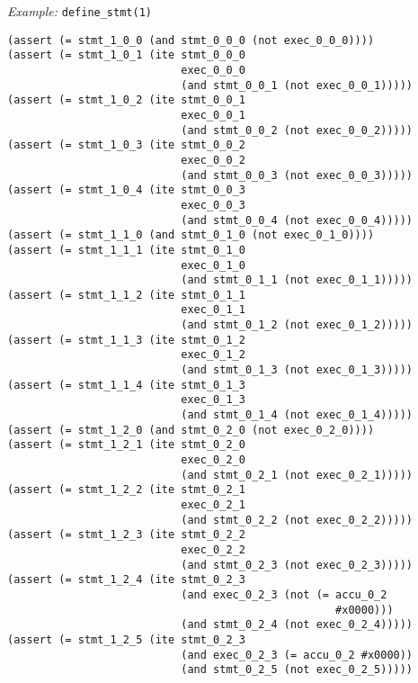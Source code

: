 \noindent
\emph{Example:} \lstinline[style=c++]{define_stmt(1)}

\newpage

\begin{lstlisting}[language=smtlib]
(assert (= stmt_1_0_0 (and stmt_0_0_0 (not exec_0_0_0))))
(assert (= stmt_1_0_1 (ite stmt_0_0_0
                           exec_0_0_0
                           (and stmt_0_0_1 (not exec_0_0_1)))))
(assert (= stmt_1_0_2 (ite stmt_0_0_1
                           exec_0_0_1
                           (and stmt_0_0_2 (not exec_0_0_2)))))
(assert (= stmt_1_0_3 (ite stmt_0_0_2
                           exec_0_0_2
                           (and stmt_0_0_3 (not exec_0_0_3)))))
(assert (= stmt_1_0_4 (ite stmt_0_0_3
                           exec_0_0_3
                           (and stmt_0_0_4 (not exec_0_0_4)))))
(assert (= stmt_1_1_0 (and stmt_0_1_0 (not exec_0_1_0))))
(assert (= stmt_1_1_1 (ite stmt_0_1_0
                           exec_0_1_0
                           (and stmt_0_1_1 (not exec_0_1_1)))))
(assert (= stmt_1_1_2 (ite stmt_0_1_1
                           exec_0_1_1
                           (and stmt_0_1_2 (not exec_0_1_2)))))
(assert (= stmt_1_1_3 (ite stmt_0_1_2
                           exec_0_1_2
                           (and stmt_0_1_3 (not exec_0_1_3)))))
(assert (= stmt_1_1_4 (ite stmt_0_1_3
                           exec_0_1_3
                           (and stmt_0_1_4 (not exec_0_1_4)))))
(assert (= stmt_1_2_0 (and stmt_0_2_0 (not exec_0_2_0))))
(assert (= stmt_1_2_1 (ite stmt_0_2_0
                           exec_0_2_0
                           (and stmt_0_2_1 (not exec_0_2_1)))))
(assert (= stmt_1_2_2 (ite stmt_0_2_1
                           exec_0_2_1
                           (and stmt_0_2_2 (not exec_0_2_2)))))
(assert (= stmt_1_2_3 (ite stmt_0_2_2
                           exec_0_2_2
                           (and stmt_0_2_3 (not exec_0_2_3)))))
(assert (= stmt_1_2_4 (ite stmt_0_2_3
                           (and exec_0_2_3 (not (= accu_0_2
                                                   #x0000)))
                           (and stmt_0_2_4 (not exec_0_2_4)))))
(assert (= stmt_1_2_5 (ite stmt_0_2_3
                           (and exec_0_2_3 (= accu_0_2 #x0000))
                           (and stmt_0_2_5 (not exec_0_2_5)))))
\end{lstlisting}

